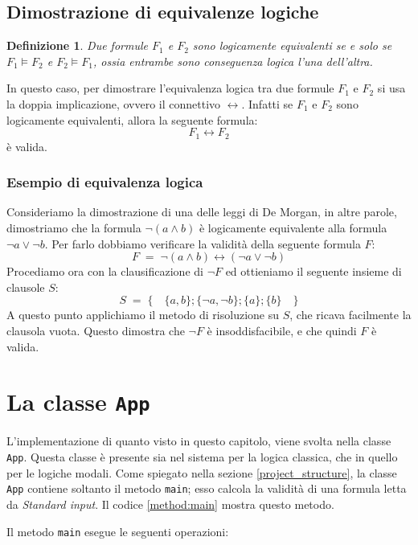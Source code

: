 \documentclass[a4paper,12pt]{report}
\newcommand{\tto} {\leftrightarrow}
\newtheorem{definition}{Definizione}[section]
\begin{document}
\subsection{Dimostrazione di equivalenze logiche}
\begin{definition}
    Due formule $F_1$ e $F_2$ sono logicamente equivalenti se e solo se $F_1 \models F_2$ e $F_2 \models F_1$, ossia entrambe sono conseguenza logica l'una dell'altra. 
\end{definition}
In questo caso, per dimostrare l'equivalenza logica tra due formule $F_1$ e $F_2$ si usa la doppia implicazione, ovvero il connettivo $\tto$. Infatti se $F_1$ e $F_2$ sono logicamente equivalenti, allora la seguente formula:
\[
    F_1 \tto F_2
\] 
è valida.
\subsubsection{Esempio di equivalenza logica}
Consideriamo la dimostrazione di una delle leggi di De Morgan, in altre parole, dimostriamo che la formula $\lnot(a \land b)$ è logicamente equivalente alla formula $\lnot a \lor \lnot b$. Per farlo dobbiamo verificare la validità della seguente formula $F$:
\[
    F \; = \; \lnot(a \land b) \tto (\lnot a \lor \lnot b)
\]
Procediamo ora con la clausificazione di $\lnot F$ ed ottieniamo il seguente insieme di clausole $S$:
\[
    S \; = \; \{\quad \{a, b\}; \{\lnot a, \lnot b\}; \{a\}; \{b\} \quad\}
\]
A questo punto applichiamo il metodo di risoluzione su $S$, che ricava facilmente la clausola vuota. Questo dimostra che $\lnot F$ è insoddisfacibile, e che quindi $F$ è valida.


\section{La classe \texttt{App}}
\label{class:App}
L'implementazione di quanto visto in questo capitolo, viene svolta nella classe \texttt{App}. Questa classe è presente sia nel sistema per la logica classica, che in quello per le logiche modali. Come spiegato nella sezione \ref{project_structure}, la classe \texttt{App} contiene soltanto il metodo \texttt{main}; esso calcola la validità di una formula letta da \emph{Standard input}. Il codice \ref{method:main} mostra questo metodo.

Il metodo \texttt{main} esegue le seguenti operazioni:
\end{document}
